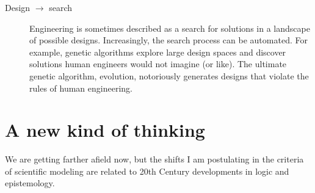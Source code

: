 \documentclass[10pt]{book}
\begin{document}
\begin{description}
\item[Design $\rightarrow$ search] Engineering is sometimes described
  as a search for solutions in a landscape of possible designs.
  Increasingly, the search process can be automated.  For example,
  genetic algorithms explore large design spaces and discover
  solutions human engineers would not imagine (or like).  The ultimate
  genetic algorithm, evolution, notoriously generates designs that
  violate the rules of human engineering.

\end{description}


\section{A new kind of thinking}

We are getting farther afield now, but the shifts I am postulating
in the criteria of scientific modeling are related to 20th Century
developments in logic and epistemology.
\end{document}
